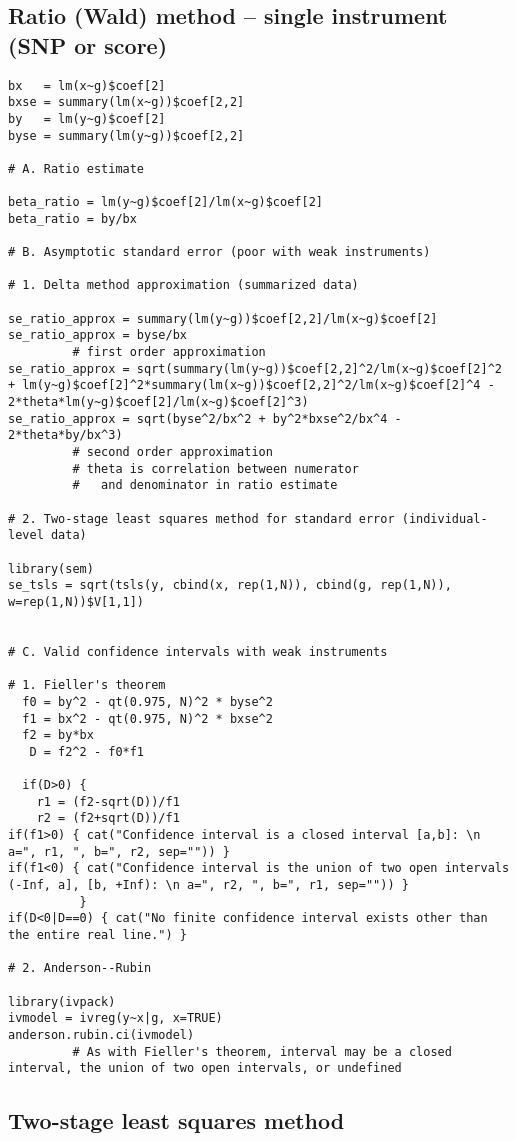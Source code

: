 \documentclass[a4paper,12pt]{article} %
\begin{document}
\subsection{Ratio (Wald) method -- single instrument (SNP or score)}
\begin{lstlisting}
bx   = lm(x~g)$coef[2]
bxse = summary(lm(x~g))$coef[2,2]
by   = lm(y~g)$coef[2]
byse = summary(lm(y~g))$coef[2,2]

# A. Ratio estimate

beta_ratio = lm(y~g)$coef[2]/lm(x~g)$coef[2]
beta_ratio = by/bx

# B. Asymptotic standard error (poor with weak instruments)

# 1. Delta method approximation (summarized data)

se_ratio_approx = summary(lm(y~g))$coef[2,2]/lm(x~g)$coef[2]
se_ratio_approx = byse/bx
         # first order approximation
se_ratio_approx = sqrt(summary(lm(y~g))$coef[2,2]^2/lm(x~g)$coef[2]^2 + lm(y~g)$coef[2]^2*summary(lm(x~g))$coef[2,2]^2/lm(x~g)$coef[2]^4 - 2*theta*lm(y~g)$coef[2]/lm(x~g)$coef[2]^3)
se_ratio_approx = sqrt(byse^2/bx^2 + by^2*bxse^2/bx^4 - 2*theta*by/bx^3)
         # second order approximation
         # theta is correlation between numerator
         #   and denominator in ratio estimate

# 2. Two-stage least squares method for standard error (individual-level data)

library(sem)
se_tsls = sqrt(tsls(y, cbind(x, rep(1,N)), cbind(g, rep(1,N)), w=rep(1,N))$V[1,1])


# C. Valid confidence intervals with weak instruments

# 1. Fieller's theorem
  f0 = by^2 - qt(0.975, N)^2 * byse^2
  f1 = bx^2 - qt(0.975, N)^2 * bxse^2
  f2 = by*bx
   D = f2^2 - f0*f1

  if(D>0) {
    r1 = (f2-sqrt(D))/f1
    r2 = (f2+sqrt(D))/f1
if(f1>0) { cat("Confidence interval is a closed interval [a,b]: \n a=", r1, ", b=", r2, sep="")) }
if(f1<0) { cat("Confidence interval is the union of two open intervals (-Inf, a], [b, +Inf): \n a=", r2, ", b=", r1, sep="")) }
          }
if(D<0|D==0) { cat("No finite confidence interval exists other than the entire real line.") }

# 2. Anderson--Rubin

library(ivpack)
ivmodel = ivreg(y~x|g, x=TRUE)
anderson.rubin.ci(ivmodel)
         # As with Fieller's theorem, interval may be a closed interval, the union of two open intervals, or undefined
\end{lstlisting}

\clearpage

\subsection{Two-stage least squares method}
\end{document}
